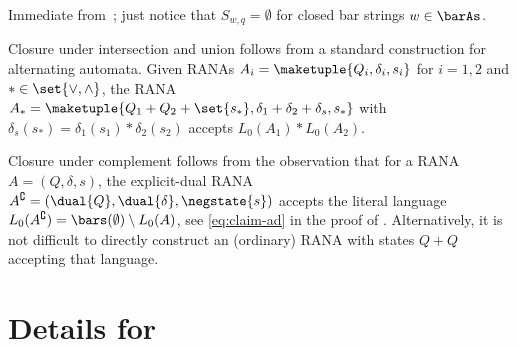 \documentclass[10pt, final, conference, a4paper, twocolumn]{IEEEtran}
\begin{document}
\begin{IEEEproof}
Immediate from~; just notice that $S_{w,q}=\emptyset$ for closed bar strings $w\in \barAs$. 
\end{IEEEproof}

\begin{IEEEproof}
  Closure under intersection and union follows from a standard construction for alternating automata. Given RANAs $A_i = \maketuple{Q_i, \delta_i, s_i}$
  for $i = 1, 2$ and $\ast\in\set{\vee,\wedge}$, the RANA $A_{\ast} = \maketuple{Q_1 + Q_2 + \set{s_\ast},
  \delta_1 + \delta_2 + \delta_s, s_\ast}$ 
  with $\delta_s(s_\ast) = \delta_1(s_1) \ast \delta_2(s_2)$ accepts $L_0(A_1) \ast L_0(A_2)$.

Closure under complement follows from the observation that for a RANA $A=(Q,\delta,s)$, the explicit-dual RANA $A^\complement=(\dual{Q},\dual{\delta},\negstate{s})$ accepts the literal language $L_0(A^\complement)=\bars(\emptyset)\setminus L_0(A)$, see \eqref{eq:claim-ad} in the proof of . Alternatively, it is not difficult to directly construct an (ordinary) RANA with states $Q+Q$ accepting that language.
\end{IEEEproof}

\section{Details for~\label{app:secLOG}}
\end{document}
